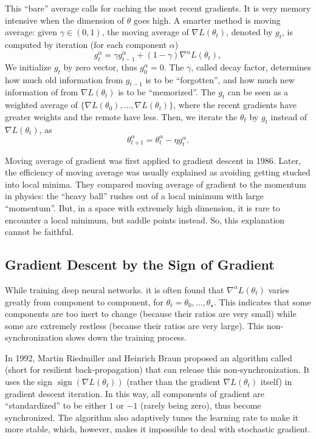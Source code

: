 \documentclass[superscriptaddress,twocolumn,aps,prd,10pt,nofootinbib,preprintnumbers]{revtex4-2}
\newcommand{\tmop}[1]{\ensuremath{\operatorname{#1}}}
\newcommand{\tmverbatim}[1]{\text{{\ttfamily{#1}}}}
\begin{document}
This ``bare'' average calls for caching the most recent gradients. It is very
memory intensive when the dimension of $\theta$ goes high. A smarter method is
moving average: given $\gamma \in (0, 1)$, the moving average of $\nabla L
(\theta_t)$, denoted by $g_t$, is computed by iteration (for each component
$\alpha$)
\begin{equation}
  g^{\alpha}_t = \gamma g^{\alpha}_{t - 1} + (1 - \gamma) \nabla^{\alpha} L
  (\theta_t), \label{equation:moving average}
\end{equation}
We initialize $g_t$ by zero vector, thus $g_0^{\alpha} = 0$. The $\gamma$,
called decay factor, determines how much old information from $g_{t - 1}$ is
to be ``forgotten'', and how much new information of from $\nabla L
(\theta_t)$ is to be ``memorized''. The $g_t$ can be seen as a weighted
average of $\{ \nabla L (\theta_0), \ldots, \nabla L (\theta_t) \}$, where the
recent gradients have greater weights and the remote have less. Then, we
iterate the $\theta_t$ by $g_t$ instead of $\nabla L (\theta_t)$, as
\begin{equation}
  \theta^{\alpha}_{t + 1} = \theta^{\alpha}_t - \eta g^{\alpha}_t .
  \label{equation:moving average 2}
\end{equation}


Moving average of gradient was first applied to gradient descent in
1986.\cite{backprop} Later, the
efficiency of moving average was usually explained as avoiding getting stucked
into local minima. They compared moving average of gradient to the momentum in
physics: the ``heavy ball'' rushes out of a local minimum with large
``momentum''. But, in a space with extremely high dimension, it is rare to
encounter a local minimum, but saddle points
instead.\cite{saddle} So, this
explanation cannot be faithful.

\subsection{Gradient Descent by the Sign of Gradient}

While training deep neural networks. it is often found that $\nabla^{\alpha} L
(\theta_t)$ varies greatly from component to component, for $\theta_t =
\theta_0, \ldots, \theta_{\star}$. This indicates that some components are too
inert to change (because their ratios are very small) while some are extremely
restless (because their ratios are very large). This non-synchronization slows
down the training process.

In 1992, Martin Riedmiller and Heinrich Braun proposed an algorithm called
\tmverbatim{rprop} (short for resilient back-propagation) that can release
this non-synchronization.\cite{rprop} It
uses the sign $\tmop{sign} (\nabla L (\theta_t))$ (rather than the gradient
$\nabla L (\theta_t)$ itself) in gradient descent iteration. In this way, all
components of gradient are ``standardized'' to be either $1$ or $- 1$ (rarely
being zero), thus become synchronized. The \tmverbatim{rprop} algorithm also
adaptively tunes the learning rate to make it more stable, which, however,
makes it impossible to deal with stochastic gradient.
\end{document}
